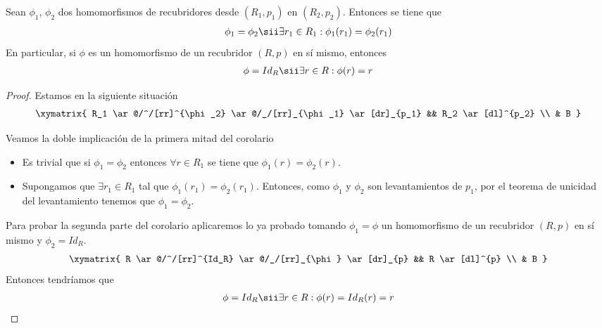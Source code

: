 \begin{coro}\label{coro-2.3.1}
    Sean $\phi_1$, $\phi_2$ dos homomorfismos de recubridores desde $(R_1,p_1)$ en $(R_2,p_2)$. Entonces se tiene que 
    \begin{gather*}
        \phi_1 = \phi_2 \sii \exists r_1\in R_1 : \phi_1(r_1) = \phi_2(r_1)
    \end{gather*}
    En particular, si $\phi$ es un homomorfismo de un recubridor $(R,p)$ en sí mismo, entonces
    \begin{gather*}
        \phi = Id_{R} \sii \exists r \in R : \phi(r)=r
    \end{gather*}

    \begin{proof}
        Estamos en la siguiente situación
        \begin{gather*}
            \xymatrix{
                R_1 \ar@/^/[rr]^{\phi_2} \ar@/_/[rr]_{\phi_1} \ar[dr]_{p_1} && R_2 \ar[dl]^{p_2} \\
                & B
            }
        \end{gather*}

        Veamos la doble implicación de la primera mitad del corolario
        \begin{itemize}
            \item[$\Rightarrow$)] Es trivial que si $\phi_1=\phi_2$ entonces $\forall r \in R_1$ se tiene que $\phi_1(r)=\phi_2(r)$.
            \item[$\Leftarrow$)] Supongamos que $\exists r_1\in R_1$ tal que $\phi_1(r_1)=\phi_2(r_1)$. Entonces, como $\phi_1$ y $\phi_2$ son levantamientos de $p_1$, por el teorema de unicidad del levantamiento tenemos que $\phi_1=\phi_2$.
        \end{itemize}

        Para probar la segunda parte del corolario aplicaremos lo ya probado tomando $\phi_1=\phi$ un homomorfismo de un recubridor $(R,p)$ en sí mismo y $\phi_2=Id_R$.
        \begin{gather*}
            \xymatrix{
                R \ar@/^/[rr]^{Id_R} \ar@/_/[rr]_{\phi} \ar[dr]_{p} && R \ar[dl]^{p} \\
                & B
            }
        \end{gather*}
        Entonces tendríamos que 
        \begin{gather*}
            \phi = Id_R \sii \exists r\in R : \phi(r)=Id_R(r)=r
        \end{gather*}
    \end{proof}
\end{coro}

